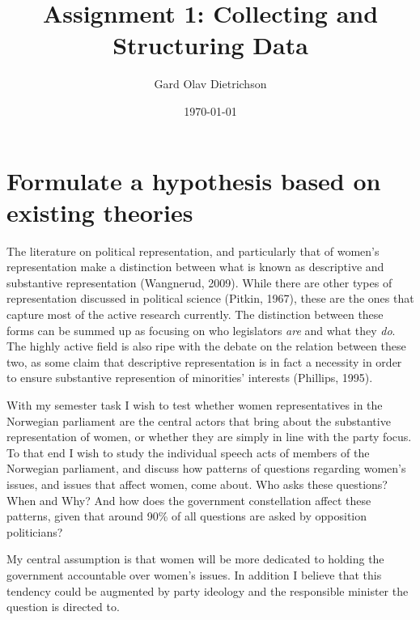 \documentclass[12pt]{article}
\title{Assignment 1: Collecting and Structuring Data}
\author{Gard Olav Dietrichson}
\date{\today}
\begin{document}
	\maketitle

\section{Formulate a hypothesis based on existing theories}
The literature on political representation, and particularly that of women's representation make a distinction between what is known as descriptive and substantive representation (Wangnerud, 2009). While there are other types of representation discussed in political science (Pitkin, 1967), these are the ones that capture most of the active research currently. The distinction between these forms can be summed up as focusing on who legislators \textit{are} and what they \textit{do}. The highly active field is also ripe with the debate on the relation between these two, as some claim that descriptive representation is in fact a necessity in order to ensure substantive represention of minorities' interests (Phillips, 1995).

With my semester task I wish to test whether women representatives in the Norwegian parliament are the central actors that bring about the substantive representation of women, or whether they are simply in line with the party focus. To that end I wish to study the individual speech acts of members of the Norwegian parliament, and discuss how patterns of questions regarding women's issues, and issues that affect women, come about. Who asks these questions? When and Why? And how does the government constellation affect these patterns, given that around 90\% of all questions are asked by opposition politicians?

My central assumption is that women will be more dedicated to holding the government accountable over women's issues. In addition I believe that this tendency could be augmented by party ideology and the responsible minister the question is directed to. 
\end{document}
